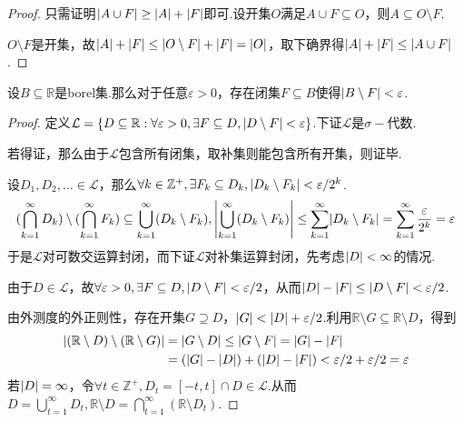 \begin{proof}
    只需证明\(\abs*{A \cup F} \geq \abs*{A}+\abs*{F}\)即可.设开集\(O\)满足\(A \cup F \subseteq O\)，则\(A \subseteq O \setminus F\).
    
    \(O \setminus F\)是开集，故\(\abs*{A}+\abs*{F} \leq \abs*{O \setminus F}+\abs*{F}=\abs*{O}\)，取下确界得\(\abs*{A}+\abs*{F} \leq \abs*{A \cup F}\).
\end{proof}

\begin{theorem}[2.65]\label{2.65}
    设\(B \subseteq \mathbb{R}\)是borel集.那么对于任意\(\varepsilon>0\)，存在闭集\(F \subseteq B\)使得\(\abs*{B \setminus F}<\varepsilon\).
\end{theorem}

\begin{proof}
    定义\(\mathcal{L}=\{D \subseteq \mathbb{R}: \forall \varepsilon>0, \exists F \subseteq D, \abs*{D \setminus F}<\varepsilon\}\).下证\(\mathcal{L}\)是\(\sigma-\)代数.

    {\kaishu 若得证，那么由于\(\mathcal{L}\)包含所有闭集，取补集则能包含所有开集，则证毕}.

    设\(D_1, D_2, \dots \in \mathcal{L}\)，那么\(\forall k \in \mathbb{Z}^+, \exists F_k \subseteq D_k, \abs*{D_k \setminus F_k}<\varepsilon/2^k\).
    \begin{align*}
        (\bigcap_{k=1}^\infty D_k) \setminus (\bigcap_{k=1}^\infty F_k) \subseteq \bigcup_{k=1}^\infty (D_k \setminus F_k),
        \abs*{\bigcup_{k=1}^\infty (D_k \setminus F_k)} \leq \sum_{k=1}^\infty \abs*{D_k \setminus F_k}=\sum_{k=1}^\infty \frac{\varepsilon}{2^k}=\varepsilon 
    \end{align*}
    于是\(\mathcal{L}\)对可数交运算封闭，而下证\(\mathcal{L}\)对补集运算封闭，先考虑\(\abs*{D}<\infty\)的情况.
    
    由于\(D \in \mathcal{L}\)，故\(\forall \varepsilon>0, \exists F \subseteq D, \abs*{D \setminus F}<\varepsilon/2\)，从而\(\abs*{D}-\abs*{F} \leq \abs*{D \setminus F}<\varepsilon/2\).
    
    由{\kaishu 外测度的外正则性}，存在开集\(G \supseteq D\)，\(\abs*{G}<\abs*{D}+\varepsilon/2\).利用\(\mathbb{R} \setminus G \subseteq \mathbb{R} \setminus D\)，得到
    \begin{align*}
        \abs*{(\mathbb{R} \setminus D) \setminus (\mathbb{R} \setminus G)}&=\abs*{G \setminus D} \leq \abs*{G \setminus F}=\abs*{G}-\abs*{F} \\
        &=(\abs*{G}-\abs*{D})+(\abs*{D}-\abs*{F})<\varepsilon/2+\varepsilon/2=\varepsilon 
    \end{align*}
    若\(\abs*{D}=\infty\)，令\(\forall t \in \mathbb{Z}^+, D_t=[-t,t] \cap D \in \mathcal{L}\).从而\(D=\bigcup_{t=1}^\infty D_t, \mathbb{R} \setminus D=\bigcap_{t=1}^\infty (\mathbb{R} \setminus D_t)\).


\end{proof}
